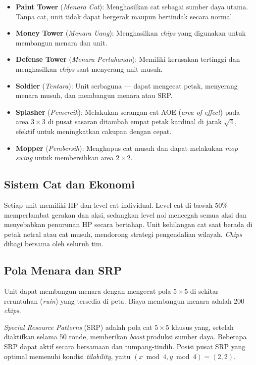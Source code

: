 \documentclass[12pt, a4paper]{article}
\begin{document}
\begin{itemize}
    \item \textbf{Paint Tower} (\textit{Menara Cat}): Menghasilkan cat sebagai
          sumber daya utama. Tanpa cat, unit tidak dapat bergerak maupun bertindak
          secara normal.
    \item \textbf{Money Tower} (\textit{Menara Uang}): Menghasilkan \textit{chips}
          yang digunakan untuk membangun menara dan unit.
    \item \textbf{Defense Tower} (\textit{Menara Pertahanan}): Memiliki kerusakan
          tertinggi dan menghasilkan \textit{chips} saat menyerang unit musuh.
    \item \textbf{Soldier} (\textit{Tentara}): Unit serbaguna --- dapat mengecat
          petak, menyerang menara musuh, dan membangun menara atau SRP.
    \item \textbf{Splasher} (\textit{Pemercik}): Melakukan serangan cat AOE
          (\textit{area of effect}) pada area $3\times3$ di pusat sasaran ditambah
          empat petak kardinal di jarak $\sqrt{4}$, efektif untuk meningkatkan
          cakupan dengan cepat.
    \item \textbf{Mopper} (\textit{Pembersih}): Menghapus cat musuh dan dapat
          melakukan \textit{mop swing} untuk membersihkan area $2\times2$.
\end{itemize}

\subsection*{Sistem Cat dan Ekonomi}

Setiap unit memiliki HP dan level cat individual. Level cat di bawah 50\%
memperlambat gerakan dan aksi, sedangkan level nol mencegah semua aksi dan
menyebabkan penurunan HP secara bertahap. Unit kehilangan cat saat berada di
petak netral atau cat musuh, mendorong strategi pengendalian wilayah.
\textit{Chips} dibagi bersama oleh seluruh tim.

\subsection*{Pola Menara dan SRP}

Unit dapat membangun menara dengan mengecat pola $5\times5$ di sekitar reruntuhan
(\textit{ruin}) yang tersedia di peta. Biaya membangun menara adalah 200
\textit{chips}.

\textit{Special Resource Patterns} (SRP) adalah pola cat $5\times5$ khusus yang,
setelah diaktifkan selama 50 ronde, memberikan \textit{boost} produksi sumber daya.
Beberapa SRP dapat aktif secara bersamaan dan tumpang-tindih. Posisi pusat SRP yang
optimal memenuhi kondisi \textit{tilability}, yaitu $(x \bmod 4, y \bmod 4) = (2, 2)$.
\end{document}
